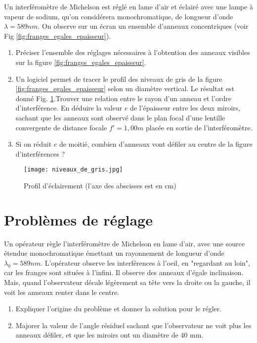 \documentclass{article}
\begin{document}
Un interféromètre de Michelson est réglé en lame d'air et éclairé avec une lampe à vapeur de sodium, qu'on considérera monochromatique, de longueur d'onde $\lambda = 589nm$.
On observe sur un écran un ensemble d'anneaux concentriques (voir Fig \ref{fig:franges_egales_epaisseur}). 
\begin{enumerate}
  \item Préciser l'ensemble des réglages nécessaires à l'obtention des anneaux visibles sur la figure \ref{fig:franges_egales_epaisseur}. 
  \item Un logiciel permet de tracer le profil des niveaux de gris de la figure \ref{fig:franges_egales_epaisseur} selon un diamètre vertical. Le résultat est donné Fig. \ref{fig:niveaux_de_gris}.Trouver une relation entre le rayon d'un anneau et l'ordre d'interférence. En déduire la valeur $e$ de l'épaisseur entre les deux miroirs, sachant que les anneaux sont observé dans le plan focal d'une lentille convergente de distance focale $f'=1,00m$ placée en sortie de l'interféromètre.
  \item Si on réduit $e$ de moitié, combien d'anneaux vont défiler au centre de la figure d'interférences ?  
\end{enumerate}

\begin{figure}[h]
  \centering
  \texttt{[image: niveaux\_de\_gris.jpg]}
  \caption{Profil d'éclairement (l'axe des abscisses est en cm)}   
  \label{fig:niveaux_de_gris}
\end{figure}

\section{Problèmes de réglage}
Un opérateur règle l'interféromètre de Michelson en lame d'air, avec une source étendue monochromatique émettant un rayonnement de longueur d'onde $\lambda_0 = 589 nm$. 
L'opérateur observe les interférences à l'oeil, en "regardant au loin", car les franges sont situées à l'infini.
Il observe des anneaux d'égale inclinaison. 
Mais, quand l'observateur décale légèrement sa tête vers la droite ou la gauche, il voit les anneaux renter dans le centre. 
\begin{enumerate}
  \item Expliquer l'origine du problème et donner la solution pour le régler. 
  \item Majorer la valeur de l'angle résiduel sachant que l'observateur ne voit plus les anneaux défiler, et que les miroirs ont un diamètre de 40 mm. 
\end{enumerate}
\end{document}
